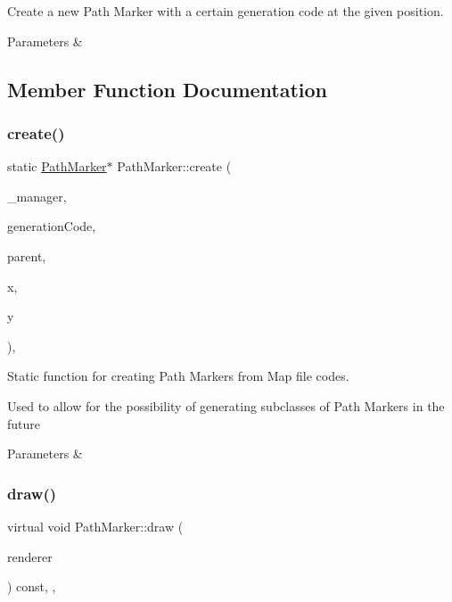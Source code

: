 Create a new Path Marker with a certain generation code at the given position. 


\begin{DoxyParams}{Parameters}
{\em } & \\
\hline
\end{DoxyParams}


\subsection{Member Function Documentation}
\mbox{\label{class_path_marker_a94f5904dbb1b63290bb700312201e698}} 
\subsubsection{\texorpdfstring{create()}{create()}}
{\footnotesize\ttfamily static \mbox{\hyperlink{class_path_marker}{Path\+Marker}}$\ast$ Path\+Marker\+::create (\begin{DoxyParamCaption}\item[{\mbox{\hyperlink{class_game_manager}{Game\+Manager}} $\ast$}]{\+\_\+manager,  }\item[{int}]{generation\+Code,  }\item[{\mbox{\hyperlink{class_game_entity}{Game\+Entity}} $\ast$}]{parent,  }\item[{float}]{x,  }\item[{float}]{y }\end{DoxyParamCaption})\hspace{0.3cm}{\ttfamily [inline]}, {\ttfamily [static]}}



Static function for creating Path Markers from Map file codes. 

Used to allow for the possibility of generating subclasses of Path Markers in the future


\begin{DoxyParams}{Parameters}
{\em } & \\
\hline
\end{DoxyParams}
\mbox{\label{class_path_marker_a8dae7801545e5cea55285af8e55d9888}} 
\subsubsection{\texorpdfstring{draw()}{draw()}}
{\footnotesize\ttfamily virtual void Path\+Marker\+::draw (\begin{DoxyParamCaption}\item[{\mbox{\hyperlink{classsf_1_1_render_target}{sf\+::\+Render\+Target}} \&}]{renderer }\end{DoxyParamCaption}) const\hspace{0.3cm}{\ttfamily [inline]}, {\ttfamily [override]}, {\ttfamily [virtual]}}



